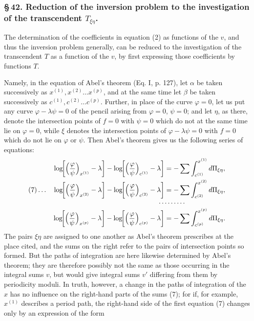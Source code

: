 \documentclass[10pt]{article}
\begin{document}
\subsubsection*{\S\,42. Reduction of the inversion problem to the investigation of the transcendent \(T_{\xi\eta}\).}

The determination of the coefficients in equation (2) as functions of the \(v\), and thus the inversion problem generally, can be reduced to the investigation of the transcendent \(T\) as a function of the \(v\), by first expressing those coefficients by functions \(T\).

Namely, in the equation of Abel's theorem (Eq. I, p. 127), let \(\alpha\) be taken successively as \(x^{(1)},x^{(2)}\ldots x^{(p)}\), and at the same time let \(\beta\) be taken successively as \(c^{(1)},c^{(2)}\ldots c^{(p)}\). Further, in place of the curve \(\varphi=0\), let us put any curve \(\varphi-\lambda\psi=0\) of the pencil arising from \(\varphi=0\), \(\psi=0\); and let \(\eta\), as there, denote the intersection points of \(f=0\) with \(\psi=0\) which do not at the same time lie on \(\varphi=0\), while \(\xi\) denotes the intersection points of \(\varphi-\lambda\psi=0\) with \(f=0\) which do not lie on \(\varphi\) or \(\psi\). Then Abel's theorem gives us the following series of equations:
\[
\begin{aligned}
\log\!\biggl[\Bigl(\frac{\varphi}{\psi}\Bigr)_{x^{(1)}}-\lambda\biggr]
-\log\!\biggl[\Bigl(\frac{\varphi}{\psi}\Bigr)_{c^{(1)}}-\lambda\biggr]
&=-\sum\int_{c^{(1)}}^{x^{(1)}}d\Pi_{\xi\eta},\\
(7)\ldots\quad
\log\!\biggl[\Bigl(\frac{\varphi}{\psi}\Bigr)_{x^{(2)}}-\lambda\biggr]
-\log\!\biggl[\Bigl(\frac{\varphi}{\psi}\Bigr)_{c^{(2)}}-\lambda\biggr]
&=-\sum\int_{c^{(2)}}^{x^{(2)}}d\Pi_{\xi\eta},\\[-0.3em]
&\hspace{-1.0em}\cdots\cdots\cdots\\[-0.3em]
\log\!\biggl[\Bigl(\frac{\varphi}{\psi}\Bigr)_{x^{(p)}}-\lambda\biggr]
-\log\!\biggl[\Bigl(\frac{\varphi}{\psi}\Bigr)_{c^{(p)}}-\lambda\biggr]
&=-\sum\int_{c^{(p)}}^{x^{(p)}}d\Pi_{\xi\eta}.
\end{aligned}
\]
The pairs \(\xi\eta\) are assigned to one another as Abel's theorem prescribes at the place cited, and the sums on the right refer to the pairs of intersection points so formed. But the paths of integration are here likewise determined by Abel's theorem; they are therefore possibly not the same as those occurring in the integral sums \(v\), but would give integral sums \(v'\) differing from them by periodicity moduli. In truth, however, a change in the paths of integration of the \(x\) has no influence on the right-hand parts of the sums (7); for if, for example, \(x^{(1)}\) describes a period path, the right-hand side of the first equation (7) changes only by an expression of the form
\end{document}
